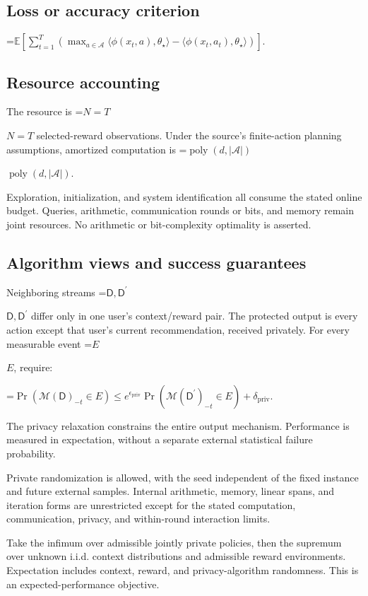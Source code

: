 \documentclass[10pt,a4paper]{article}
\newcommand{\AtlasMath}[1]{\par\begingroup\centering\setbox0=\hbox{$\displaystyle #1$}\ifdim\wd0>1.4\linewidth\typeout{ATLAS WIDE FORMULA: \the\wd0}\fi\ifdim\wd0>\linewidth\resizebox{\linewidth}{!}{\box0}\else\box0\fi\par\endgroup}
\newcommand{\AtlasInlineMath}[1]{\begingroup\setbox0=\hbox{$#1$}\ifdim\wd0>.4\linewidth\endgroup\AtlasMath{#1}\else\endgroup$#1$\fi}
\begin{document}
\subsection{Loss or accuracy criterion}

\AtlasMath{\mathbb{E}\!\left[\sum_{t=1}^{T}\left(\max_{a\in\mathcal{A}}\langle\phi(x_t,a),\theta_\star\rangle-\langle\phi(x_t,a_t),\theta_\star\rangle\right)\right].}


\subsection{Resource accounting}
The resource is \AtlasInlineMath{N=T} selected-reward observations. Under the source's finite-action planning assumptions, amortized computation is \AtlasInlineMath{\operatorname{poly}(d,|\mathcal{A}|)}.

Exploration, initialization, and system identification all consume the stated online budget. Queries, arithmetic, communication rounds or bits, and memory remain joint resources. No arithmetic or bit-complexity optimality is asserted.

\subsection{Algorithm views and success guarantees}
Neighboring streams \AtlasInlineMath{\mathsf D,\mathsf D^{\prime}} differ only in one user's context/reward pair. The protected output is every action except that user's current recommendation, received privately. For every measurable event \AtlasInlineMath{E}, require:


\AtlasMath{\Pr\!\left(\mathcal{M}(\mathsf D)_{-t}\in E\right)\le e^{\epsilon_{\mathrm{priv}}}\Pr\!\left(\mathcal{M}(\mathsf D^{\prime})_{-t}\in E\right)+\delta_{\mathrm{priv}}.}


The privacy relaxation constrains the entire output mechanism. Performance is measured in expectation, without a separate external statistical failure probability.

Private randomization is allowed, with the seed independent of the fixed instance and future external samples. Internal arithmetic, memory, linear spans, and iteration forms are unrestricted except for the stated computation, communication, privacy, and within-round interaction limits.

Take the infimum over admissible jointly private policies, then the supremum over unknown i.i.d. context distributions and admissible reward environments. Expectation includes context, reward, and privacy-algorithm randomness. This is an expected-performance objective.
\end{document}
